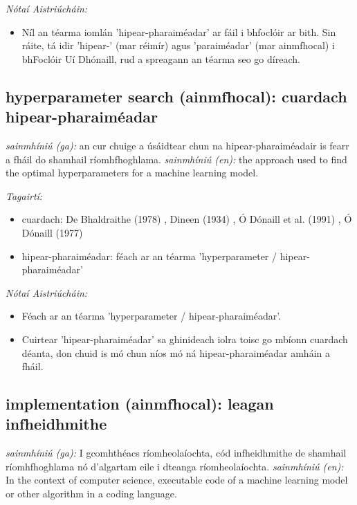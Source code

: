 \documentclass{article}
\begin{document}
 \noindent \textit{Nótaí Aistriúcháin:}
\begin{itemize}
	\item Níl an téarma iomlán 'hipear-pharaiméadar' ar fáil i bhfoclóir ar bith. Sin ráite, tá idir 'hipear-' (mar réimír) agus 'paraiméadar' (mar ainmfhocal) i bhFoclóir Uí Dhónaill, rud a spreagann an téarma seo go díreach.
\end{itemize}


\subsection*{hyperparameter search (ainmfhocal): cuardach hipear-pharaiméadar} 
 \noindent \textit{sainmhíniú (ga):} an cur chuige a úsáidtear chun na hipear-pharaiméadair is fearr a fháil do shamhail ríomhfhoghlama.
\newline\newline
 \noindent \textit{sainmhíniú (en):} the approach used to find the optimal hyperparameters for a machine learning model.
\newline

 \noindent \textit{Tagairtí:}
\begin{itemize}
	\item cuardach: De Bhaldraithe (1978) \cite{de-bhaldraithe}, Dineen (1934) \cite{dineen}, Ó Dónaill et al. (1991) \cite{focloir-beag}, Ó Dónaill (1977) \cite{odonaill}
	\item hipear-pharaiméadar: féach ar an téarma 'hyperparameter / hipear-pharaiméadar'
\end{itemize}

 \noindent \textit{Nótaí Aistriúcháin:}
\begin{itemize}
	\item Féach ar an téarma 'hyperparameter / hipear-pharaiméadar'.
	\item Cuirtear 'hipear-pharaiméadar' sa ghinideach iolra toisc go mbíonn cuardach déanta, don chuid is mó chun níos mó ná hipear-pharaiméadar amháin a fháil.
\end{itemize}


\subsection*{implementation (ainmfhocal): leagan infheidhmithe} 
 \noindent \textit{sainmhíniú (ga):} I gcomhthéacs ríomheolaíochta, cód infheidhmithe de shamhail ríomhfhoghlama nó d'algartam eile i dteanga ríomheolaíochta.
\newline\newline
 \noindent \textit{sainmhíniú (en):} In the context of computer science, executable code of a machine learning model or other algorithm in a coding language.
\newline
\end{document}
